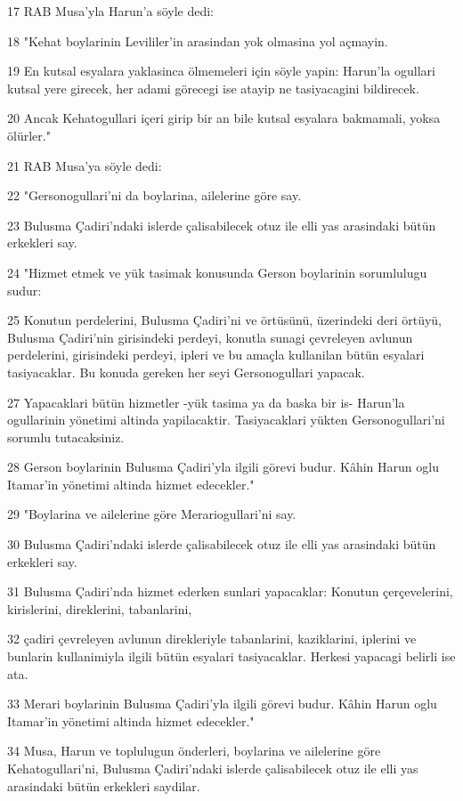 \par 17 RAB Musa'yla Harun'a söyle dedi:
\par 18 "Kehat boylarinin Levililer'in arasindan yok olmasina yol açmayin.
\par 19 En kutsal esyalara yaklasinca ölmemeleri için söyle yapin: Harun'la ogullari kutsal yere girecek, her adami görecegi ise atayip ne tasiyacagini bildirecek.
\par 20 Ancak Kehatogullari içeri girip bir an bile kutsal esyalara bakmamali, yoksa ölürler."
\par 21 RAB Musa'ya söyle dedi:
\par 22 "Gersonogullari'ni da boylarina, ailelerine göre say.
\par 23 Bulusma Çadiri'ndaki islerde çalisabilecek otuz ile elli yas arasindaki bütün erkekleri say.
\par 24 "Hizmet etmek ve yük tasimak konusunda Gerson boylarinin sorumlulugu sudur:
\par 25 Konutun perdelerini, Bulusma Çadiri'ni ve örtüsünü, üzerindeki deri örtüyü, Bulusma Çadiri'nin girisindeki perdeyi, konutla sunagi çevreleyen avlunun perdelerini, girisindeki perdeyi, ipleri ve bu amaçla kullanilan bütün esyalari tasiyacaklar. Bu konuda gereken her seyi Gersonogullari yapacak.
\par 27 Yapacaklari bütün hizmetler -yük tasima ya da baska bir is- Harun'la ogullarinin yönetimi altinda yapilacaktir. Tasiyacaklari yükten Gersonogullari'ni sorumlu tutacaksiniz.
\par 28 Gerson boylarinin Bulusma Çadiri'yla ilgili görevi budur. Kâhin Harun oglu Itamar'in yönetimi altinda hizmet edecekler."
\par 29 "Boylarina ve ailelerine göre Merariogullari'ni say.
\par 30 Bulusma Çadiri'ndaki islerde çalisabilecek otuz ile elli yas arasindaki bütün erkekleri say.
\par 31 Bulusma Çadiri'nda hizmet ederken sunlari yapacaklar: Konutun çerçevelerini, kirislerini, direklerini, tabanlarini,
\par 32 çadiri çevreleyen avlunun direkleriyle tabanlarini, kaziklarini, iplerini ve bunlarin kullanimiyla ilgili bütün esyalari tasiyacaklar. Herkesi yapacagi belirli ise ata.
\par 33 Merari boylarinin Bulusma Çadiri'yla ilgili görevi budur. Kâhin Harun oglu Itamar'in yönetimi altinda hizmet edecekler."
\par 34 Musa, Harun ve toplulugun önderleri, boylarina ve ailelerine göre Kehatogullari'ni, Bulusma Çadiri'ndaki islerde çalisabilecek otuz ile elli yas arasindaki bütün erkekleri saydilar.
